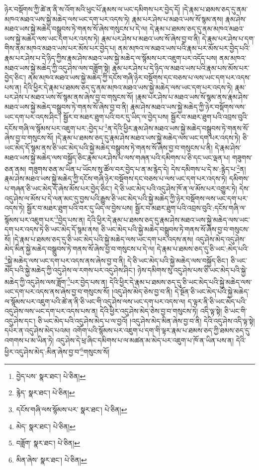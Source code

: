ཉེར་བསྡོགས་ཀྱི་ཚེ་ན་ནི་ས་འོག་མའི་ཕུང་པོ་རྣམས་ལ་ཡང་དམིགས་པར་བྱེད་དོ། །དེ་རྣམ་པ་ཐམས་ཅད་དུ་ནམ་མཁའ་མཐའ་ཡས་སྐྱེ་མཆེད་ལས་ཡང་དག་པར་འདས་ཏེ། རྣམ་པར་ཤེས་པ་མཐའ་ཡས་སོ་སྙམ་ནས། རྣམ་ཤེས་མཐའ་ཡས་སྐྱེ་མཆེད་བསྒྲུབས་ཏེ་གནས་སོ་ཞེས་གསུངས་པ་དེ་ལ། དེ་རྣམ་པ་ཐམས་ཅད་དུ་ནམ་མཁའ་མཐའ་ཡས་སྐྱེ་མཆེད་ལས་ཡང་དག་པར་འདས་ཏེ། རྣམ་པར་ཤེས་པ་མཐའ་ཡས་སོ་ཞེས་བྱ་བ་ནི། དེ་རྣམ་པར་ཤེས་པ་དག་གིས་ནམ་མཁའ་མཐའ་ཡས་པར་མོས་པར་བྱེད་པ། ནམ་མཁའ་ལ་མཐའ་ཡས་པའི་རྣམ་པར་མོས་པར་བྱེད་པའི་རྣམ་པར་ཤེས་པ་དེ་ཉིད་ཀྱིས་རྣམ་ཤེས་མཐའ་ཡས་སྐྱེ་མཆེད་ལ་སྙོམས་པར་འཇུག་པར་འདོད་པས། ནམ་མཁའ་མཐའ་ཡས་སྐྱེ་མཆེད་ཀྱི་འདུ་ཤེས་ལས་བཟློག་སྟེ། རྣམ་པར་ཤེས་པ་དེ་ཉིད་ལ་མཐའ་ཡས་པའི་རྣམ་པས་མོས་པར་བྱེད་ཅིང་། ནམ་མཁའ་མཐའ་ཡས་སྐྱེ་མཆེད་ཀྱི་དངོས་གཞི་ཉེར་བསྡོགས་དང་བཅས་པ་ལས་ཡང་དག་པར་འདས་པས་ན། དེའི་ཕྱིར་དེ་རྣམ་པ་ཐམས་ཅད་དུ་ནམ་མཁའ་མཐའ་ཡས་སྐྱེ་མཆེད་ལས་ཡང་དག་པར་འདས་ཏེ། རྣམ་པར་ཤེས་པ་མཐའ་ཡས་སོ་སྙམ་ནས་ཞེས་བྱ་བ་གསུངས་སོ། །རྣམ་པར་ཤེས་པ་མཐའ་ཡས་སོ་སྙམ་ནས་རྣམ་ཤེས་མཐའ་ཡས་སྐྱེ་མཆེད་བསྒྲུབས་ཏེ་གནས་སོ་ཞེས་བྱ་བ་ནི། རྣམ་ཤེས་མཐའ་ཡས་སྐྱེ་མཆེད་ཀྱི་ཉེར་བསྡོགས་ལས་ཡང་དག་པར་འདས་ཤིང་། སྦྱོར་བ་མཐར་ཐུག་པའི་བར་དུ་ཡིད་ལ་བྱེད་པས། སྦྱོར་བ་མཐར་ཐུག་པའི་འབྲས་བུའི་དངོས་གཞི་ལ་སྙོམས་པར་འཇུག་པར་:བྱེད་པ་\footnote{བྱེད་པས་  སྣར་ཐང་།  པེ་ཅིན། }ན་དེའི་ཕྱིར་རྣམ་ཤེས་མཐའ་ཡས་སྐྱེ་མཆེད་བསྒྲུབས་ཏེ་གནས་སོ་ཞེས་བྱ་བ་གསུངས་སོ། །དེ་རྣམ་པ་ཐམས་ཅད་དུ་རྣམ་ཤེས་མཐའ་ཡས་སྐྱེ་མཆེད་ལས་ཡང་དག་པར་འདས་ཏེ། ཅི་ཡང་མེད་དོ་སྙམ་ནས་ཅི་ཡང་མེད་པའི་སྐྱེ་མཆེད་བསྒྲུབས་ཏེ་གནས་སོ་ཞེས་བྱ་བ་གསུངས་པ་ནི། དེ་རྣམ་ཤེས་མཐའ་ཡས་སྐྱེ་མཆེད་ལས་བསྐྱོད་ཅིང་རྣམ་པར་ཤེས་པ་ལས་གཞན་པའི་དམིགས་པ་ཅི་དང་ཡང་ལྡན་པ། གཟུགས་ཅན་ནམ། གཟུགས་ཅན་མ་ཡིན་པ་ཡོངས་སུ་ཚོལ་བར་བྱེད་པ་ན་མ་རྙེད་དེ། དེས་དམིགས་པ་དེ་མ་:རྙེད་པ་\footnote{རྙེད་  སྣར་ཐང་།  པེ་ཅིན། }ན། རྣམ་ཤེས་མཐའ་ཡས་སྐྱེ་མཆེད་ཀྱི་དངོས་གཞི་ཉེར་བསྡོགས་དང་བཅས་པ་ལས་ཡང་དག་པར་འདས་ཏེ། དམིགས་པ་གཞན་ཅི་ཡང་མེད་དོ་ཞེས་མོས་པར་བྱེད་ཅིང་། དེ་ཅི་ཡང་མེད་པའི་འདུ་ཤེས་ཁོ་ན་ལ་མོས་པར་འགྱུར་ཏེ། དེས་འདུ་ཤེས་ལ་མོས་པ་དེ་ལན་མང་དུ་བྱས་པའི་རྒྱུས་ཅི་ཡང་མེད་པའི་སྐྱེ་མཆེད་ཀྱི་ཉེར་བསྡོགས་ལས་ཡང་དག་པར་འདས་ཏེ། སྦྱོར་བ་མཐར་ཐུག་པའི་བར་དུ་ཡིད་ལ་བྱེས་པས། སྦྱོར་བ་མཐར་ཐུག་པའི་འབྲས་བུའི་:དངོས་གཞི་ལ་སྙོམས་པར་འཇུག་པར་\footnote{དངོས་གཞི་ལས་སྙོམས་པར་  སྣར་ཐང་།  པེ་ཅིན། }བྱེད་པས་ན། དེའི་ཕྱིར་དེ་རྣམ་པ་ཐམས་ཅད་དུ་རྣམ་ཤེས་མཐའ་ཡས་སྐྱེ་མཆེད་ལས་ཡང་དག་པར་འདས་ཏེ་ཅི་ཡང་མེད་དོ་སྙམ་ནས། ཅི་ཡང་མེད་པའི་སྐྱེ་མཆེད་བསྒྲུབས་ཏེ་གནས་སོ་ཞེས་བྱ་བ་གསུངས་སོ། །དེ་རྣམ་པ་ཐམས་ཅད་དུ་ཅི་ཡང་མེད་པའི་སྐྱེ་མཆེད་ལས་ཡང་དག་པར་འདས་ནས། འདུ་ཤེས་མེད་འདུ་ཤེས་མེད་མིན་སྐྱེ་མཆེད་བསྒྲུབས་ཏེ་གནས་སོ་ཞེས་བྱ་བ་གསུངས་པ་དེ་ལ། དེ་རྣམ་པ་ཐམས་ཅད་དུ་ཅི་ཡང་:མེད་པའི་\footnote{མེད་  སྣར་ཐང་།  པེ་ཅིན། }སྐྱེ་མཆེད་ལས་ཡང་དག་པར་འདས་ནས་ཞེས་བྱ་བ་ནི། དེ་ཅི་ཡང་མེད་པའི་སྐྱེ་མཆེད་ལས་བསྐྱོད་ཅིང་། ཅི་ཡང་མེད་པའི་སྐྱེ་མཆེད་ཀྱི་འདུ་ཤེས་ལ་རགས་པར་འདུ་ཤེས་ཤིང་། ཉེས་དམིགས་སུ་འདུ་ཤེས་པས་ཅི་ཡང་མེད་པའི་སྐྱེ་མཆེད་ཀྱི་འདུ་ཤེས་ལས་ཟློག་\footnote{བཟློག་  སྣར་ཐང་།  པེ་ཅིན། }པར་བྱེད་པས་ན། དེའི་ཕྱིར་དེ་རྣམ་པ་ཐམས་ཅད་དུ་ཅི་ཡང་མེད་པའི་སྐྱེ་མཆེད་ལས་ཡང་དག་པར་འདས་ནས་ཞེས་བྱ་བ་གསུངས་སོ། །འདུ་ཤེས་མེད་ཅེས་བྱ་བ་ནི། དེ་སྔོན་ཅི་ཡང་མེད་པའི་སྐྱེ་མཆེད་ལ་སྙོམས་པར་འཇུག་པའི་ཚེ་ན་ནི་ཅི་ཡང་གི་འདུ་ཤེས་ལས་ཡང་དག་པར་འདས་ལ། ད་ལྟར་ནི་ཅི་ཡང་མེད་པའི་འདུ་ཤེས་ལས་ཡང་དག་པར་འདས་པས་ན། དེའི་ཕྱིར་འདུ་ཤེས་མེད་ཅེས་བྱ་བ་གསུངས་ཏེ། འདི་ལྟ་སྟེ། ཅི་ཡང་གི་འདུ་ཤེས་དང་། ཅི་ཡང་མེད་པའི་འདུ་ཤེས་མེད་པ་ལ་བྱའོ། །འདུ་ཤེས་མེད་མིན་ཞེས་བྱ་བ་ནི། དེའི་འདུ་ཤེས་འདི་ལྟ་སྟེ། དཔེར་ན་འདུ་ཤེས་མེད་པའམ། འགོག་པའི་སྙོམས་པར་འཇུག་པ་དག་གི་ལྟར་རྣམ་པ་ཐམས་ཅད་ཀྱི་ཐམས་ཅད་དུ་འགགས་པ་མ་ཡིན་ཏེ། འདུ་ཤེས་དེ་ཕྲ་ཞིང་དམིགས་པ་ལ་མཚན་མ་མེད་པར་འཇུག་པ་ཁོ་ན་ཡིན་པས་ན། དེའི་ཕྱིར་འདུ་ཤེས་མེད་:མིན་ཞེས་བྱ་བ་\footnote{མིན་ཞེས་  སྣར་ཐང་།  པེ་ཅིན། }གསུངས་སོ། 